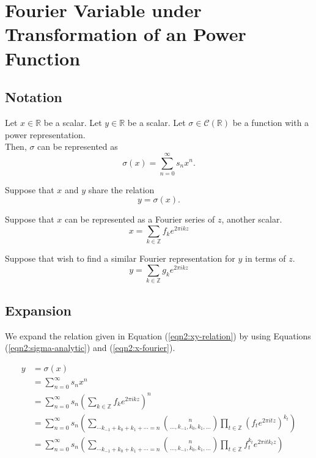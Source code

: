 \documentclass{article}
\begin{document}
    \section{Fourier Variable under Transformation of an Power Function}

    \subsection{Notation}
    Let $x \in \mathbb{R}$ be a scalar. Let $y \in \mathbb{R}$ be a scalar. Let $\sigma \in \mathcal{C}(\mathbb{R})$ be a function with a power representation.\\

    Then, $\sigma$ can be represented as
    \begin{equation}
        \sigma(x) = \sum_{n=0}^{\infty} s_n x^n.
        \label{eqn2:sigma-analytic}
    \end{equation}

    Suppose that $x$ and $y$ share the relation
    \begin{equation}
        y = \sigma(x).
        \label{eqn2:xy-relation}
    \end{equation}

    Suppose that $x$ can be represented as a Fourier series of $z$, another scalar.
    \begin{equation}
        x = \sum_{k \in \mathbb{Z}} f_k e^{2\pi i k z}
        \label{eqn2:x-fourier}
    \end{equation}

    Suppose that wish to find a similar Fourier representation for $y$ in terms of $z$.
    \begin{equation}
        y = \sum_{k \in \mathbb{Z}} g_k e^{2\pi i k z}
        \label{eqn2:y-fourier}
    \end{equation}

    \subsection{Expansion}
    We expand the relation given in Equation (\ref{eqn2:xy-relation}) by using Equations (\ref{eqn2:sigma-analytic}) and (\ref{eqn2:x-fourier}).

    \begin{align}
        y &= \sigma(x) \nonumber \\
        &= \sum_{n=0}^{\infty} s_n x^n \nonumber \\
        &= \sum_{n=0}^{\infty} s_n \left(\sum_{k \in \mathbb{Z}} f_k e^{2\pi i k z}\right)^n \nonumber \\
        &= \sum_{n=0}^{\infty} s_n \left(\sum_{\cdots k_{-1} + k_{0} + k_{1} + \cdots = n} \binom{n}{\ldots, k_{-1}, k_{0}, k_{1}, \ldots} \prod_{t \in \mathbb{Z}} \left(f_t e^{2\pi i t z}\right)^{k_t} \right) \nonumber \\
        &= \sum_{n=0}^{\infty} s_n \left(\sum_{\cdots k_{-1} + k_{0} + k_{1} + \cdots = n} \binom{n}{\ldots, k_{-1}, k_{0}, k_{1}, \ldots} \prod_{t \in \mathbb{Z}} f_t^{k_t} e^{2\pi i t k_t z} \right)
        \label{eqn2:xy-expansion}
    \end{align}
\end{document}
